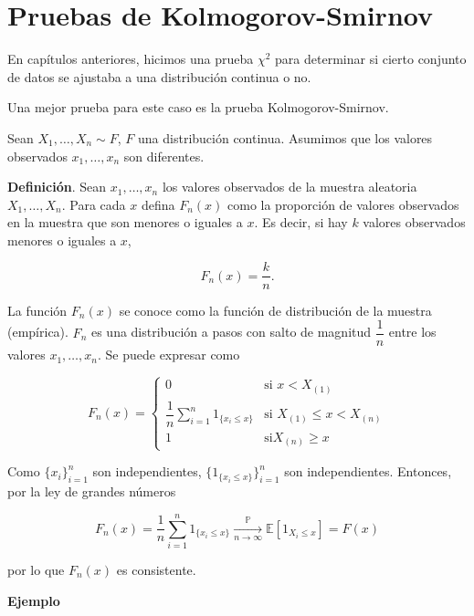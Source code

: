 \documentclass[
  12pt,
]{book}
\begin{document}
\hypertarget{pruebas-de-kolmogorov-smirnov}{%
\chapter{Pruebas de Kolmogorov-Smirnov}\label{pruebas-de-kolmogorov-smirnov}}

En capítulos anteriores, hicimos una prueba \(\chi ^2\) para determinar si
cierto conjunto de datos se ajustaba a una distribución continua o no.

Una mejor prueba para este caso es la prueba Kolmogorov-Smirnov.

Sean \(X_1,\dots,X_n\sim F\), \(F\) una distribución continua. Asumimos que los valores
observados \(x_1,\dots,x_n\) son diferentes.

\textbf{Definición}. Sean \(x_1,\dots,x_n\) los valores observados de la muestra
aleatoria \(X_1,\dots, X_n\). Para cada \(x\) defina \(F_n(x)\) como la proporción de
valores observados en la muestra que son menores o iguales a \(x\). Es decir, si
hay \(k\) valores observados menores o iguales a \(x\),

\[
F_n(x) = \frac{k}{n}.
\]

La función \(F_n(x)\) se conoce como la función de distribución de la muestra
(empírica). \(F_n\) es una distribución a pasos con salto de magnitud \(\dfrac 1n\)
entre los valores \(x_1,\dots,x_n\). Se puede expresar como

\[F_n(x) = \begin{cases}
  0 & \text{si } x<X_{(1)}\\
 \displaystyle \dfrac 1n \sum_{i=1}^n 1_{\{x_i\leq x\}} & \text{si } X_{(1)}\leq x<X_{(n)}\\
  1 & \text{si} X_{(n)}\geq x
\end{cases}
\]

Como \(\{x_i\}_{i=1}^n\) son independientes, \(\{1_{\{x_i\leq x\}}\}_{i=1}^n\) son
independientes. Entonces, por la ley de grandes números

\[
F_n(x) = \dfrac 1n \sum_{i=1}^n 1_{\{x_i\leq x\}} \xrightarrow[n\to\infty]{\mathbb P} \mathbb E[1_{X_i\leq x}] = F(x)
\]

por lo que \(F_n(x)\) es consistente.

\textbf{Ejemplo}
\end{document}
